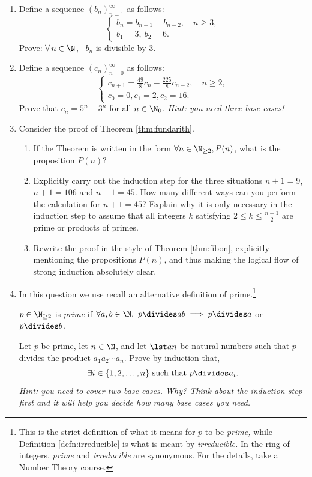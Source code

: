 \begin{enumerate}\renewcommand{\labelenumi}{\thesubsection.\theenumi}
  \item Define a sequence $(b_n)_{n=1}^\infty$ as follows:
  	\[\begin{cases}
			b_n=b_{n-1}+b_{n-2},\quad n\ge 3,\\
			b_1=3,\ b_2=6.
		\end{cases}\]
		Prove: $\forall \,n\in\N$, \ $b_n$ is divisible by 3.
	
	\item\label{ex:ind3} Define a sequence $(c_n)_{n=0}^\infty$ as follows:
	  \[\begin{cases}
			c_{n+1}=\frac{49}8c_n-\frac{225}8c_{n-2},\quad n\ge 2,\\
			c_0=0, c_1=2, c_2=16.
		\end{cases}\]
		Prove that $c_n=5^n-3^n$ for all $n\in\N_0$. \emph{Hint: you need three base cases!}\goodbreak
		
	\item Consider the proof of Theorem \ref{thm:fundarith}.
	\begin{enumerate}
	  \item If the Theorem is written in the form $\forall n\in\N_{\ge 2}, P(n)$, what is the proposition $P(n)$?
	  \item Explicitly carry out the induction step for the three situations $n+1=9$, $n+1=106$ and $n+1=45$. How many different ways can you perform the calculation for $n+1=45$? Explain why it is only necessary in the induction step to assume that all integers $k$ satisfying $2\le k\le\frac{n+1}2$ are prime or products of primes.
	  \item Rewrite the proof in the style of Theorem \ref{thm:fibon}, explicitly mentioning the propositions $P(n)$, and thus making the logical flow of strong induction absolutely clear.
	\end{enumerate}

	\item In this question we use recall an alternative definition of prime.\footnote{This is the strict definition of what it means for $p$ to be \emph{prime,} while Definition \ref{defn:irreducible} is what is meant by \emph{irreducible.} In the ring of integers, \emph{prime} and \emph{irreducible} are synonymous. For the details, take a Number Theory course.}
	\begin{defn*}
	$p\in\N_{\ge 2}$ is \emph{prime} if $\forall a,b\in\N,\ p\divides ab\implies p\divides a$ or $p\divides b$.
	\end{defn*}\vspace{-10pt}
	Let $p$ be prime, let $n\in\N$, and let $\lst an$ be natural numbers such that $p$ divides the product $a_1a_2\cdots a_n$. Prove by induction that,
	\[\exists i\in\{1,2,\ldots,n\}\text{ such that }p\divides a_i.\]
  \emph{Hint: you need to cover \emph{two} base cases. Why? Think about the induction step first and it will help you decide how many base cases you need.}
	

\end{enumerate}
